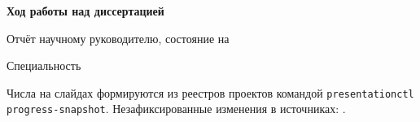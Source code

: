 \begin{frame}[plain,t]
\centering
\vspace{10mm}
{\fontsize{14}{16.8}\selectfont\InstitutionName\par}
\vspace{18mm}
{\fontsize{24}{28.8}\selectfont\bfseries Ход работы над диссертацией\par}
\vspace{6mm}
{\fontsize{16}{19.2}\selectfont Отчёт научному руководителю, состояние на \ProgAsOf\par}
\vspace{12mm}
{\fontsize{14}{16.8}\selectfont\WorkingTitle\par}
\vspace{12mm}
{\fontsize{16}{19.2}\selectfont\AuthorName\par
Специальность \SpecialtyName\par}
\vfill
{\raggedright\fontsize{10}{13}\selectfont Числа на слайдах формируются из реестров проектов командой \texttt{presentationctl progress-snapshot}. Незафиксированные изменения в источниках: \ProgUncommitted.\par}
\vspace{6mm}
\end{frame}
